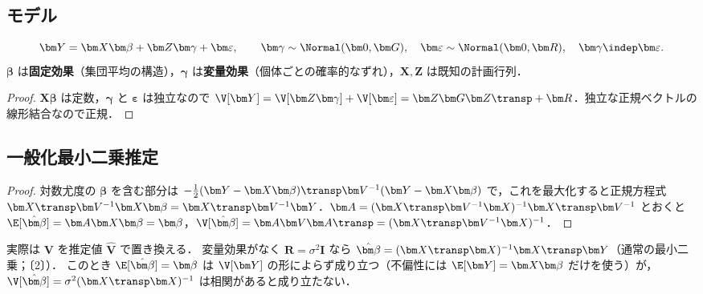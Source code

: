 \subsection{モデル}\label{subsec:08-lmmdef}
\begin{teigi}[線形混合効果モデル]\label{def:08-lmm}
\begin{equation}
\bm Y=\bm X\bm\beta+\bm Z\bm\gamma+\bm\varepsilon,\qquad \bm\gamma\sim\Normal(\bm0,\bm G),\quad \bm\varepsilon\sim\Normal(\bm0,\bm R),\quad \bm\gamma\indep\bm\varepsilon.\label{eq:08-lmm}
\end{equation}
$\bm\beta$ は\textbf{固定効果}（集団平均の構造），$\bm\gamma$ は\textbf{変量効果}（個体ごとの確率的なずれ），$\bm X,\bm Z$ は既知の計画行列．
\end{teigi}
\begin{proof}
$\bm X\bm\beta$ は定数，$\bm\gamma$ と $\bm\varepsilon$ は独立なので
$\V[\bm Y]=\V[\bm Z\bm\gamma]+\V[\bm\varepsilon]=\bm Z\bm G\bm Z\transp+\bm R$．独立な正規ベクトルの線形結合なので正規．
\end{proof}

\subsection{一般化最小二乗推定}\label{subsec:08-gls}
\begin{proof}
対数尤度の $\bm\beta$ を含む部分は $-\frac12(\bm Y-\bm X\bm\beta)\transp\bm V^{-1}(\bm Y-\bm X\bm\beta)$ で，これを最大化すると正規方程式
$\bm X\transp\bm V^{-1}\bm X\bm\beta=\bm X\transp\bm V^{-1}\bm Y$．$\bm A=(\bm X\transp\bm V^{-1}\bm X)^{-1}\bm X\transp\bm V^{-1}$ とおくと
$\E[\hat{\bm\beta}]=\bm A\bm X\bm\beta=\bm\beta$，$\V[\hat{\bm\beta}]=\bm A\bm V\bm A\transp=(\bm X\transp\bm V^{-1}\bm X)^{-1}$．
\end{proof}
実際は $\bm V$ を推定値 $\hat{\bm V}$ で置き換える．
変量効果がなく $\bm R=\sigma^2\bm I$ なら $\hat{\bm\beta}=(\bm X\transp\bm X)^{-1}\bm X\transp\bm Y$（通常の最小二乗；〔2〕）．
このとき $\E[\hat{\bm\beta}]=\bm\beta$ は $\V[\bm Y]$ の形によらず成り立つ（不偏性には $\E[\bm Y]=\bm X\bm\beta$ だけを使う）が，$\V[\hat{\bm\beta}]=\sigma^2(\bm X\transp\bm X)^{-1}$ は相関があると成り立たない．

